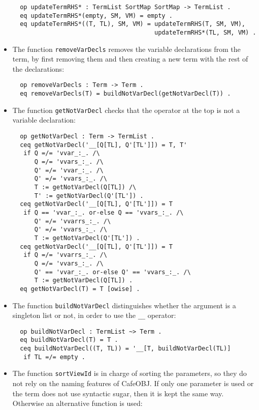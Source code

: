 \begin{itemize}
{\begin{verbatim}
  op updateTermRHS* : TermList SortMap SortMap -> TermList .
  eq updateTermRHS*(empty, SM, VM) = empty .
  eq updateTermRHS*((T, TL), SM, VM) = updateTermRHS(T, SM, VM),
                                       updateTermRHS*(TL, SM, VM) .
\end{verbatim}
}

\item
The function \verb"removeVarDecls" removes the variable declarations
from the term, by first removing them and then creating a new term with
the rest of the declarations:

{\codesize
\begin{verbatim}
  op removeVarDecls : Term -> Term .
  eq removeVarDecls(T) = buildNotVarDecl(getNotVarDecl(T)) .
\end{verbatim}
}

\item
The function \verb"getNotVarDecl" checks that the operator at the top
is not a variable declaration:

{\codesize
\begin{verbatim}
  op getNotVarDecl : Term -> TermList .
  ceq getNotVarDecl('__[Q[TL], Q'[TL']]) = T, T'
   if Q =/= 'vvar_:_. /\
      Q =/= 'vvars_:_. /\
      Q' =/= 'vvar_:_. /\
      Q' =/= 'vvars_:_. /\
      T := getNotVarDecl(Q[TL]) /\
      T' := getNotVarDecl(Q'[TL']) .
  ceq getNotVarDecl('__[Q[TL], Q'[TL']]) = T
   if Q == 'vvar_:_. or-else Q == 'vvars_:_. /\
      Q' =/= 'vvarrs_:_. /\
      Q' =/= 'vvars_:_. /\
      T := getNotVarDecl(Q'[TL']) .
  ceq getNotVarDecl('__[Q[TL], Q'[TL']]) = T
   if Q =/= 'vvarrs_:_. /\
      Q =/= 'vvars_:_. /\
      Q' == 'vvar_:_. or-else Q' == 'vvars_:_. /\
      T := getNotVarDecl(Q[TL]) .
  eq getNotVarDecl(T) = T [owise] .
\end{verbatim}
}

\item
The function \verb"buildNotVarDecl" distinguishes whether the argument is
a singleton list or not, in order to use the \verb"__" operator:

{\codesize
\begin{verbatim}
  op buildNotVarDecl : TermList ~> Term .
  eq buildNotVarDecl(T) = T .
  ceq buildNotVarDecl((T, TL)) = '__[T, buildNotVarDecl(TL)]
   if TL =/= empty .
\end{verbatim}
}

\item
The function \verb"sortViewId" is in charge of sorting the parameters, so they
do not rely on the naming features of CafeOBJ. If only one parameter is used or
the term does not use syntactic sugar, then it is kept the same way. Otherwise
an alternative function is used:


\end{itemize}
